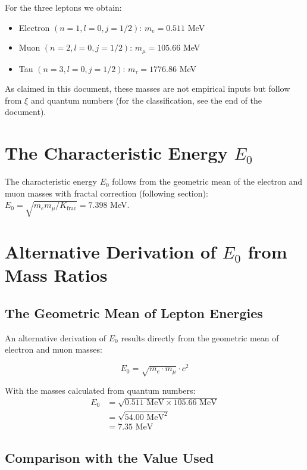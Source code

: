 	For the three leptons we obtain:
	
	\begin{itemize}
		\item Electron $(n=1, l=0, j=1/2)$: $m_e = 0.511$ MeV
		\item Muon $(n=2, l=0, j=1/2)$: $m_\mu = 105.66$ MeV
		\item Tau $(n=3, l=0, j=1/2)$: $m_\tau = 1776.86$ MeV
	\end{itemize}
	
	As claimed in this document, these masses are not empirical inputs but follow from $\xi$ and quantum numbers (for the classification, see the end of the document).
	
	\section{The Characteristic Energy $E_0$}
	
	The characteristic energy $E_0$ follows from the geometric mean of the electron and muon masses with fractal correction (following section): $E_0 = \sqrt{m_e m_\mu/K_{\text{frac}}} = 7.398$ MeV.
	
	\section{Alternative Derivation of $E_0$ from Mass Ratios}
	
	\subsection{The Geometric Mean of Lepton Energies}
	
	An alternative derivation of $E_0$ results directly from the geometric mean of electron and muon masses:
	
	\begin{equation}
		E_0 = \sqrt{m_e \cdot m_\mu} \cdot c^2
	\end{equation}
	
	With the masses calculated from quantum numbers:
	\begin{align}
		E_0 &= \sqrt{0.511 \text{ MeV} \times 105.66 \text{ MeV}}\\
		&= \sqrt{54.00 \text{ MeV}^2}\\
		&= 7.35 \text{ MeV}
	\end{align}
	
	\subsection{Comparison with the Value Used}
	
